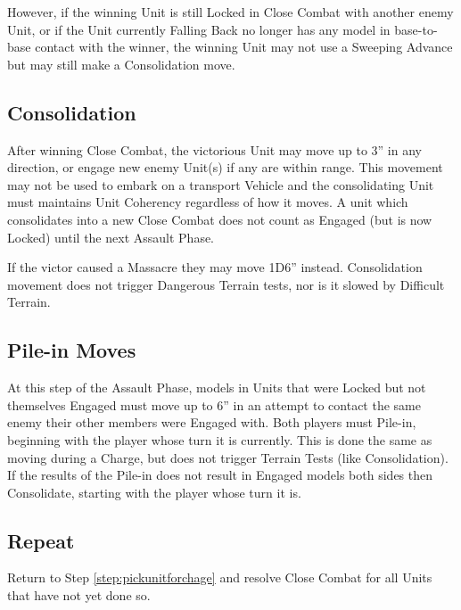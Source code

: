 However, if the winning Unit is still Locked in Close Combat
with another enemy Unit, or if the Unit currently Falling Back
no longer has any model in base-to-base contact with the
winner, the winning Unit may not use a Sweeping Advance but
may still make a Consolidation move.

\subsection{Consolidation}
\label{step:consolidation}
After winning Close Combat, the victorious Unit may move up
to 3” in any direction, or engage new enemy Unit(s) if any are
within range. This movement may not be used to embark on a
transport Vehicle and the consolidating Unit must maintains
Unit Coherency regardless of how it moves. A unit which
consolidates into a new Close Combat does not count as
Engaged (but is now Locked) until the next Assault Phase.

If the victor caused a Massacre they may move 1D6” instead.
Consolidation movement does not trigger Dangerous Terrain
tests, nor is it slowed by Difficult Terrain.


\subsection{Pile-in Moves}
\label{step:pileinmoves}
At this step of the Assault Phase, models in Units that were
Locked but not themselves Engaged must move up to 6” in an
attempt to contact the same enemy their other members were
Engaged with. Both players must Pile-in, beginning with the
player whose turn it is currently.
This is done the same as moving during a Charge, but does
not trigger Terrain Tests (like Consolidation). If the results of
the Pile-in does not result in Engaged models both sides then
Consolidate, starting with the player whose turn it is.

\subsection{Repeat}
Return to Step \ref{step:pickunitforchage} and resolve Close Combat for all Units that
have not yet done so.

\stopcountsubsections


